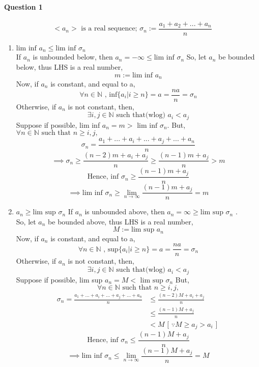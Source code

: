 \documentclass[20pt]{extarticle} %
\begin{document}
\paragraph{Question 1}
\[ <a_n>\text{ is a real sequence; }\sigma_n := \frac{a_1+a_2+...+a_n}{n} \]
\begin{enumerate}[label=\Roman*]
	\item $\text{lim inf } a_n \leq \text{lim inf }\sigma_n  $ \\
		If $a_n$ is unbounded below, then $a_n = -\infty \leq \text{lim inf }\sigma_n$
		So, let $a_n$ be bounded below, thus LHS is a real number,
		\[ m:= \text{lim inf }a_n \]
		Now, if $a_n$ is constant, and equal to a,
		\[ \forall n \in \mathbb{N} \text{ , inf} \{ a_i | i\geq n \} =a = \frac{na}{n} =\sigma_n\]
		Otherwise, if $a_n$ is not constant, then,
		\[ \exists i,j \in \mathbb{N} \text { such that(wlog) } a_i < a_j \]
		Suppose if possible, lim inf $a_n=m> \text{ lim inf } \sigma_n$.
		But, $ \forall n \in \mathbb{N} \text{ such that } n \geq i,j,$
		\[\sigma_n= \frac{a_1 + ... +a_i+... + a_j + ... + a_n}{n}\]
		\[\implies \sigma_n  \geq{\frac{(n-2)m+a_i+a_j}{n}} \geq \frac{(n-1)m+a_j}{n}>m\]
		\[	\text{Hence, inf } \sigma_n \geq \frac{(n-1)m+a_j}{n} \]
		\[		\implies \text{lim inf } \sigma_n \geq \lim_{n \to \infty} \frac{(n-1)m+a_j}{n}=m\]

	\item {}$ a_n \geq \text{lim sup }\sigma_n$
		If $a_n$ is unbounded above, then $a_n =  \infty \geq \text{lim sup }\sigma_n$ .\\

		So, let $a_n$ be bounded above, thus LHS is a real number,
		\[ M:= \text{lim sup }a_n \]
		Now, if $a_n$ is constant, and equal to a,
		\[ \forall n \in \mathbb{N} \text{ , sup} \{ a_i | i\geq n \} =a = \frac{na}{n} =\sigma_n\]
		Otherwise, if $a_n$ is not constant, then,
		\[ \exists i,j \in \mathbb{N} \text { such that(wlog) } a_i < a_j \]
		Suppose if possible, lim sup $a_n=M< \text{ lim sup } \sigma_n$
		But, \[ \forall n \in \mathbb{N} \text{ such that } n \geq i,j, \]
		\begin{equation*}
			\begin{split}
				\sigma_n= \frac{a_1 + ... +a_i +...+ a_j + ... + a_n}{n} & \leq{\frac{(n-2)M+a_i+a_j}{n}}\\
										    & \leq \frac{(n-1)M+a_j}{n}\\
										    & <M \text{ [ $\because M \geq a_j > a_i $ ] }
			\end{split}
		\end{equation*}
		\[	\text{Hence, inf } \sigma_n \leq \frac{(n-1)M+a_j}{n} \]
		\[		\implies \text{lim inf } \sigma_n \leq \lim_{n \to \infty} \frac{(n-1)M+a_j}{n}=M\]
\end{enumerate}
\end{document}
